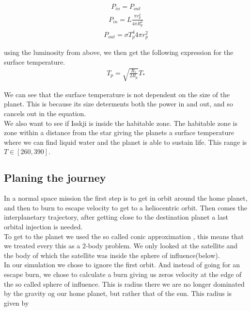 \documentclass[a4paper, 10pt]{article}
\begin{document}
\begin{align}
P_{in} = P_{out}
\end{align}
\begin{align}
 P_{in} = L \frac{\pi r_p^2}{4\pi R_p^2}
\end{align}
\begin{align}
 P_{out} = \sigma T_p^4 4\pi r_p^2
\end{align}

using the luminosity from above, we then get the following expression for the surface temperature.
\begin{align}\label{eq:temp}
 T_p = \sqrt{\frac{R_*}{2R_p}}T_*
\end{align}

We can see that the surface temperature is not dependent on the size of the planet. This is because its size  determents both the power in and out, and so cancels out in the equation.\\

We also want to see if Isskji is inside the habitable zone. The habitable zone is zone within a distance from the star giving the planets a surface temperature where we can find liquid water and the planet is able to sustain life. This range is $T \in [260 , 390]$.

\subsection{Planing the journey}
In a normal space mission the first step is to get in orbit around the home planet, and then to burn to escape velocity to get to a heliocentric orbit. Then comes the interplanetary trajectory, after getting close to the destination planet a last orbital injection is needed.\\

To get to the planet we used the so called conic approximation \cite{SpaceDynamics}, this means that we treated every this as a 2-body problem. We only looked at the satellite and the body of which the satellite was inside the sphere of influence(below). \\

In our simulation we chose to ignore the first orbit. And instead of going for an escape burn, we chose to calculate a burn giving us zeros velocity at the edge of the so called sphere of influence. This is radius there we are no longer dominated by the gravity og our home planet, but rather that of the sun. This radius is given by\cite{sphere}
\end{document}
